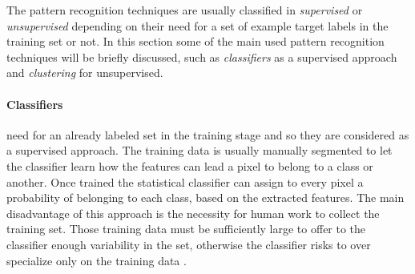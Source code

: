 \documentclass{standalone}
\begin{document}
The pattern recognition techniques are usually classified in \textit{supervised} or \textit{unsupervised} depending on their need for a set of example target labels in the training set or not.
In this section some of the main used pattern recognition techniques will be briefly discussed, such as \emph{classifiers} as a supervised approach and \emph{clustering} for unsupervised.

\paragraph{Classifiers}
need for an already labeled set in the training stage and so they are considered as a supervised approach. The training data is usually manually segmented to let the classifier learn how the features can lead a pixel to belong to a class or another. Once trained the statistical classifier can assign to every pixel a probability of belonging to each class, based on the extracted features.
The main disadvantage of this approach is the necessity for human work to collect the training set. Those training data must be sufficiently large to offer to the classifier enough variability in the set, otherwise the classifier risks to over specialize only on the training data \cite{ART:Pham, ART:Withey, mastersthesis:Biondi}.
\end{document}
